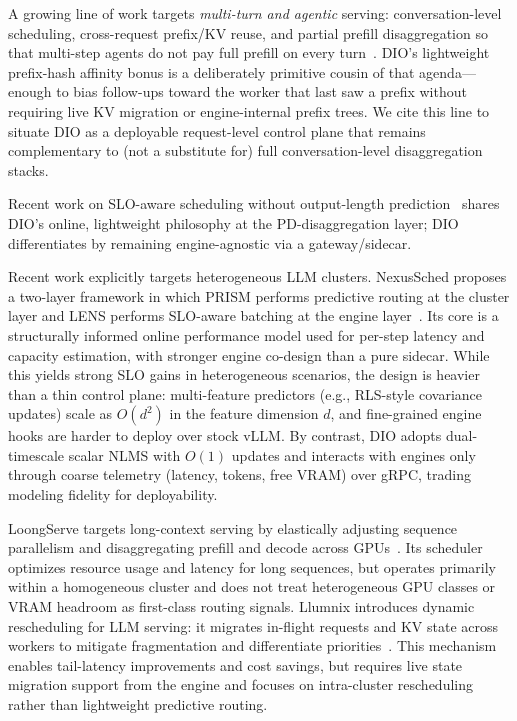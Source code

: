 \documentclass[10pt,twocolumn,letterpaper]{article}
\begin{document}
A growing line of work targets \emph{multi-turn and agentic} serving: conversation-level scheduling, cross-request prefix/KV reuse, and partial prefill disaggregation so that multi-step agents do not pay full prefill on every turn~\cite{sglang,mooncake,memserve,llumnix}.
DIO's lightweight prefix-hash affinity bonus is a deliberately primitive cousin of that agenda---enough to bias follow-ups toward the worker that last saw a prefix without requiring live KV migration or engine-internal prefix trees.
We cite this line to situate DIO as a deployable request-level control plane that remains complementary to (not a substitute for) full conversation-level disaggregation stacks.

Recent work on SLO-aware scheduling without output-length prediction~\cite{sloaware2026} shares DIO's online, lightweight philosophy at the PD-disaggregation layer; DIO differentiates by remaining engine-agnostic via a gateway/sidecar.

Recent work explicitly targets heterogeneous LLM clusters.
NexusSched proposes a two-layer framework in which PRISM performs predictive routing at the cluster layer and LENS performs SLO-aware batching at the engine layer~\cite{nexussched}.
Its core is a structurally informed online performance model used for per-step latency and capacity estimation, with stronger engine co-design than a pure sidecar.
While this yields strong SLO gains in heterogeneous scenarios, the design is heavier than a thin control plane: multi-feature predictors (e.g., RLS-style covariance updates) scale as $O(d^2)$ in the feature dimension $d$, and fine-grained engine hooks are harder to deploy over stock vLLM.
By contrast, DIO adopts dual-timescale scalar NLMS with $O(1)$ updates and interacts with engines only through coarse telemetry (latency, tokens, free VRAM) over gRPC, trading modeling fidelity for deployability.

LoongServe targets long-context serving by elastically adjusting sequence parallelism and disaggregating prefill and decode across GPUs~\cite{loongserve}.
Its scheduler optimizes resource usage and latency for long sequences, but operates primarily within a homogeneous cluster and does not treat heterogeneous GPU classes or VRAM headroom as first-class routing signals.
Llumnix introduces dynamic rescheduling for LLM serving: it migrates in-flight requests and KV state across workers to mitigate fragmentation and differentiate priorities~\cite{llumnix}.
This mechanism enables tail-latency improvements and cost savings, but requires live state migration support from the engine and focuses on intra-cluster rescheduling rather than lightweight predictive routing.
\end{document}
